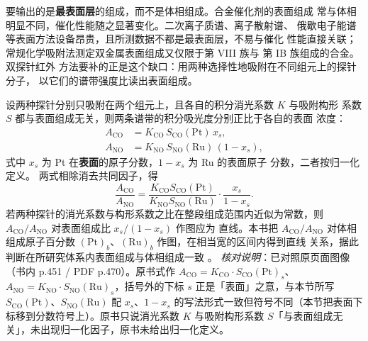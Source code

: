 \begin{probout}
要输出的是\textbf{最表面层}的组成，而不是体相组成。合金催化剂的表面组成
常与体相明显不同，催化性能随之显著变化。二次离子质谱、离子散射谱、
俄歇电子能谱等表面方法设备昂贵，且所测数据不都是最表面层，不易与催化
性能直接关联；常规化学吸附法测定双金属表面组成又仅限于第 VIII 族与
第 IB 族组成的合金。双探针红外
方法要补的正是这个缺口：用两种选择性地吸附在不同组元上的探针分子，
以它们的谱带强度比读出表面组成。
\end{probout}

\begin{principle}
设两种探针分别只吸附在两个组元上，且各自的积分消光系数 $K$ 与吸附构形
系数 $S$ 都与表面组成无关，则两条谱带的积分吸光度分别正比于各自的表面
浓度：
\begin{align}
  A_{\mathrm{CO}} &= K_{\mathrm{CO}}\,S_{\mathrm{CO}}(\mathrm{Pt})\,x_{s},
  \label{eq:ch07b-co-abs}\\
  A_{\mathrm{NO}} &= K_{\mathrm{NO}}\,S_{\mathrm{NO}}(\mathrm{Ru})\,(1-x_{s}),
  \label{eq:ch07b-no-abs}
\end{align}
式中 $x_{s}$ 为 Pt 在\textbf{表面}的原子分数，$1-x_{s}$ 为 Ru 的表面原子
分数，二者按归一化定义。
两式相除消去共同因子，得
\begin{equation}
  \frac{A_{\mathrm{CO}}}{A_{\mathrm{NO}}}
  =\frac{K_{\mathrm{CO}}S_{\mathrm{CO}}(\mathrm{Pt})}{K_{\mathrm{NO}}S_{\mathrm{NO}}(\mathrm{Ru})}
  \cdot\frac{x_{s}}{1-x_{s}} .
  \label{eq:ch07b-ratio}
\end{equation}
若两种探针的消光系数与构形系数之比在整段组成范围内近似为常数，则
$A_{\mathrm{CO}}/A_{\mathrm{NO}}$ 对表面组成比 $x_{s}/(1-x_{s})$ 作图应为
直线。本书把 $A_{\mathrm{CO}}/A_{\mathrm{NO}}$ 对体相组成原子百分数
$(\mathrm{Pt})_{b}$、$(\mathrm{Ru})_{b}$ 作图，在相当宽的区间内得到直线
关系，据此判断在所研究体系内表面组成与体相组成一致
。
\emph{核对说明}：已对照原页面图像（书内 p.451 / PDF p.470）。原书式作 $A_{\mathrm{CO}}=K_{\mathrm{CO}}\cdot S_{\mathrm{CO}}(\mathrm{Pt})_{s}$、$A_{\mathrm{NO}}=K_{\mathrm{NO}}\cdot S_{\mathrm{NO}}(\mathrm{Ru})_{s}$，括号外的下标 $s$ 正是「表面」之意，与本节所写 $S_{\mathrm{CO}}(\mathrm{Pt})$、$S_{\mathrm{NO}}(\mathrm{Ru})$ 配 $x_{s}$、$1-x_{s}$ 的写法形式一致但符号不同（本节把表面下标移到分数符号上）。原书只说消光系数 $K$ 与吸附构形系数 $S$「与表面组成无关」，未出现归一化因子，原书未给出归一化定义。
\end{principle}

